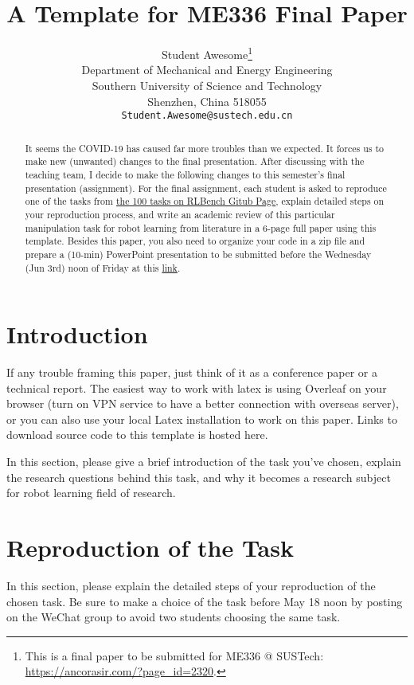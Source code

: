 \documentclass{article}
\title{A Template for ME336 Final Paper}
\author{
  Student Awesome\thanks{This is a final paper to be submitted for ME336 @ SUSTech: \url{https://ancorasir.com/?page_id=2320}. } \\
  Department of Mechanical and Energy Engineering\\
  Southern University of Science and Technology\\
  Shenzhen, China 518055 \\
  \texttt{Student.Awesome@sustech.edu.cn} \\
}
\begin{document}
\maketitle

\begin{abstract}
It seems the COVID-19 has caused far more troubles than we expected. It forces us to make new (unwanted) changes to the final presentation. After discussing with the teaching team, I decide to make the following changes to this semester's final presentation (assignment). For the final assignment, each student is asked to reproduce one of the tasks from \href{https://github.com/stepjam/RLBench}{the 100 tasks on RLBench Gitub Page}, explain detailed steps on your reproduction process, and write an academic review of this particular manipulation task for robot learning from literature in a 6-page full paper using this template. Besides this paper, you also need to organize your code in a zip file and prepare a (10-min) PowerPoint presentation to be submitted before the Wednesday (Jun 3rd) noon of Friday at this \href{https://jinshuju.net/f/wsq98y}{link}.
\end{abstract}



\section{Introduction}
\label{sec:intro}
If any trouble framing this paper, just think of it as a conference paper or a technical report. The easiest way to work with latex is using Overleaf on your browser (turn on VPN service to have a better connection with overseas server), or you can also use your local Latex installation to work on this paper. Links to download source code to this template is hosted here.

In this section, please give a brief introduction of the task you've chosen, explain the research questions behind this task, and why it becomes a research subject for robot learning field of research.

\section{Reproduction of the Task}
\label{sec:taskReproduction}
In this section, please explain the detailed steps of your reproduction of the chosen task. Be sure to make a choice of the task before May 18 noon by posting on the WeChat group to avoid two students choosing the same task. 
\end{document}
